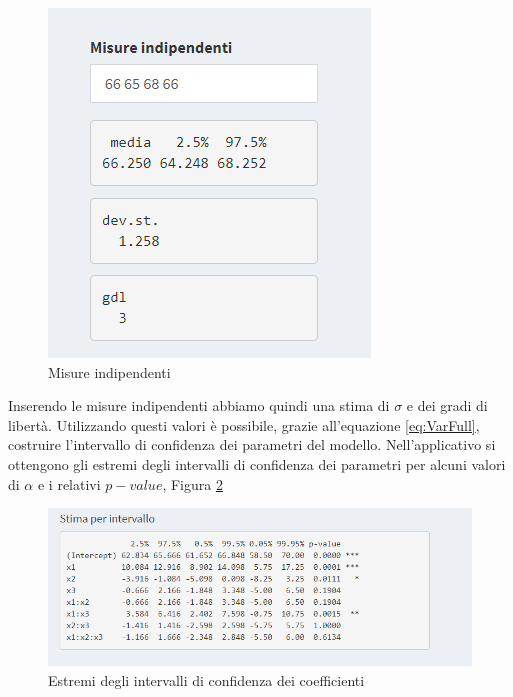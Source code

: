 \documentclass[
  11pt,
]{book}
\begin{document}
\begin{figure}

{\centering \includegraphics[width=1\linewidth]{Immagini/Fatt_compl/10_mis_ind} 

}

\caption{Misure indipendenti}\label{fig:fc10}
\end{figure}

Inserendo le misure indipendenti abbiamo quindi una stima di \(\sigma\) e
dei gradi di libertà. Utilizzando questi valori è possibile, grazie
all'equazione \eqref{eq:VarFull}, costruire l'intervallo di confidenza dei
parametri del modello. Nell'applicativo si ottengono gli estremi degli
intervalli di confidenza dei parametri per alcuni valori di \(\alpha\) e i
relativi \(p-value\), Figura \ref{fig:fc11}

\begin{figure}

{\centering \includegraphics[width=1\linewidth]{Immagini/Fatt_compl/11_intconf} 

}

\caption{Estremi degli intervalli di confidenza dei coefficienti}\label{fig:fc11}
\end{figure}
\end{document}
